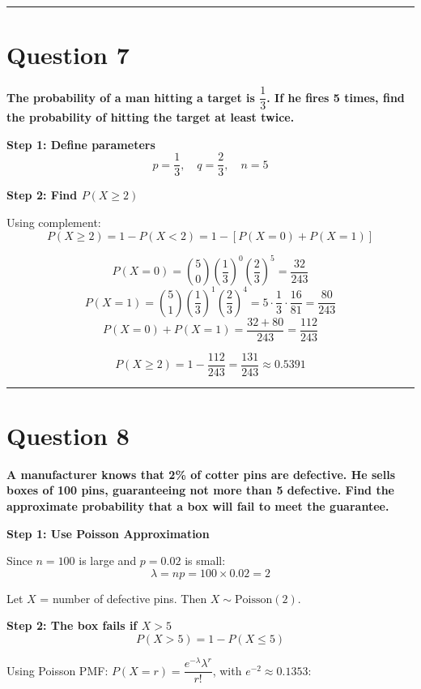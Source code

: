 \documentclass[12pt,a4paper]{article}
\begin{document}
\vspace{1em}\hrule\vspace{1em}

\section{Question 7}
\textbf{The probability of a man hitting a target is $\dfrac{1}{3}$. If he fires 5 times, find the probability of hitting the target at least twice.}

\textbf{Step 1: Define parameters}
\[
p = \frac{1}{3},\quad q = \frac{2}{3},\quad n = 5
\]

\textbf{Step 2: Find $P(X \geq 2)$}

Using complement:
\[
P(X \geq 2) = 1 - P(X < 2) = 1 - [P(X=0) + P(X=1)]
\]

\[
P(X=0) = \binom{5}{0}\left(\frac{1}{3}\right)^0\left(\frac{2}{3}\right)^5 = \frac{32}{243}
\]
\[
P(X=1) = \binom{5}{1}\left(\frac{1}{3}\right)^1\left(\frac{2}{3}\right)^4 = 5\cdot\frac{1}{3}\cdot\frac{16}{81} = \frac{80}{243}
\]
\[
P(X=0) + P(X=1) = \frac{32+80}{243} = \frac{112}{243}
\]

\[
P(X \geq 2) = 1 - \frac{112}{243} = \frac{131}{243} \approx \boxed{0.5391}
\]

\vspace{1em}\hrule\vspace{1em}

\section{Question 8}
\textbf{A manufacturer knows that 2\% of cotter pins are defective. He sells boxes of 100 pins, guaranteeing not more than 5 defective. Find the approximate probability that a box will fail to meet the guarantee.}

\textbf{Step 1: Use Poisson Approximation}

Since $n = 100$ is large and $p = 0.02$ is small:
\[
\lambda = np = 100 \times 0.02 = 2
\]

Let $X$ = number of defective pins. Then $X \sim \text{Poisson}(2)$.

\textbf{Step 2: The box fails if $X > 5$}
\[
P(X > 5) = 1 - P(X \leq 5)
\]

Using Poisson PMF: $P(X=r) = \dfrac{e^{-\lambda}\lambda^r}{r!}$, with $e^{-2} \approx 0.1353$:
\end{document}
